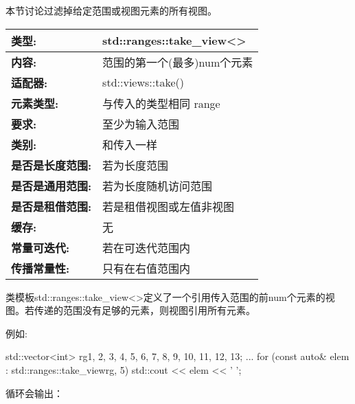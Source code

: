 

本节讨论过滤掉给定范围或视图元素的所有视图。



\begin{longtable}[c]{|l|l|}
\hline
\textbf{类型:}                 & std::ranges::take\_view\textless{}\textgreater{} \\ \hline
\endfirsthead
%
\endhead
%
\textbf{内容:}              & 范围的第一个(最多)num个元素        \\ \hline
\textbf{适配器:}              & std::views::take()                               \\ \hline
\textbf{元素类型:}         & 与传入的类型相同 range                        \\ \hline
\textbf{要求:}             & 至少为输入范围                             \\ \hline
\textbf{类别:}             & 和传入一样                                   \\ \hline
\textbf{是否是长度范围:}       & 若为长度范围                              \\ \hline
\textbf{是否是通用范围:}      &若为长度随机访问范围                  \\ \hline
\textbf{是否是租借范围:}    & 若是租借视图或左值非视图        \\ \hline
\textbf{缓存:}               & 无                                          \\ \hline
\textbf{常量可迭代:}       & 若在可迭代范围内                       \\ \hline
\textbf{传播常量性:} & 只有在右值范围内                          \\ \hline
\end{longtable}

类模板std::ranges::take\_view<>定义了一个引用传入范围的前num个元素的视图。若传递的范围没有足够的元素，则视图引用所有元素。

例如:

\begin{cpp}
std::vector<int> rg{1, 2, 3, 4, 5, 6, 7, 8, 9, 10, 11, 12, 13};
...
for (const auto& elem : std::ranges::take_view{rg, 5}) {
	std::cout << elem << ' ';
}
\end{cpp}

循环会输出：

